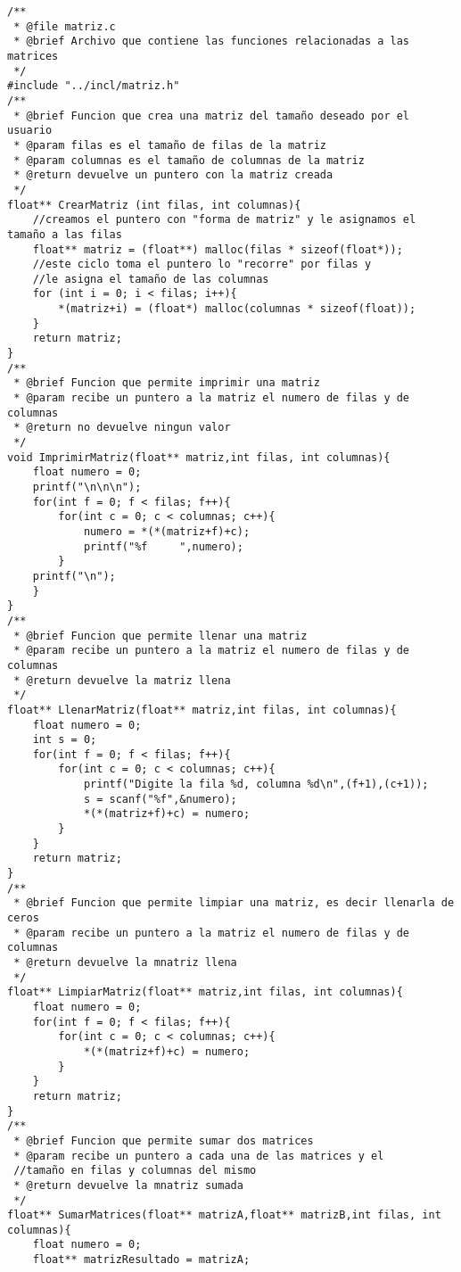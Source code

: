 \begin{verbatim} 
/**
 * @file matriz.c
 * @brief Archivo que contiene las funciones relacionadas a las matrices
 */
#include "../incl/matriz.h"
/**
 * @brief Funcion que crea una matriz del tamaño deseado por el usuario
 * @param filas es el tamaño de filas de la matriz
 * @param columnas es el tamaño de columnas de la matriz
 * @return devuelve un puntero con la matriz creada
 */
float** CrearMatriz (int filas, int columnas){
    //creamos el puntero con "forma de matriz" y le asignamos el tamaño a las filas
    float** matriz = (float**) malloc(filas * sizeof(float*));
    //este ciclo toma el puntero lo "recorre" por filas y 
    //le asigna el tamaño de las columnas 
    for (int i = 0; i < filas; i++){
        *(matriz+i) = (float*) malloc(columnas * sizeof(float));
    } 
    return matriz;
}
/**
 * @brief Funcion que permite imprimir una matriz
 * @param recibe un puntero a la matriz el numero de filas y de columnas
 * @return no devuelve ningun valor
 */
void ImprimirMatriz(float** matriz,int filas, int columnas){
    float numero = 0;
    printf("\n\n\n");
    for(int f = 0; f < filas; f++){
        for(int c = 0; c < columnas; c++){
            numero = *(*(matriz+f)+c);
            printf("%f     ",numero);
        }
    printf("\n"); 
    }   
}
/**
 * @brief Funcion que permite llenar una matriz
 * @param recibe un puntero a la matriz el numero de filas y de columnas
 * @return devuelve la matriz llena
 */
float** LlenarMatriz(float** matriz,int filas, int columnas){
    float numero = 0;
    int s = 0;
    for(int f = 0; f < filas; f++){
        for(int c = 0; c < columnas; c++){
            printf("Digite la fila %d, columna %d\n",(f+1),(c+1));
            s = scanf("%f",&numero);
            *(*(matriz+f)+c) = numero;
        }
    }
    return matriz;
}
/**
 * @brief Funcion que permite limpiar una matriz, es decir llenarla de ceros
 * @param recibe un puntero a la matriz el numero de filas y de columnas
 * @return devuelve la mnatriz llena
 */
float** LimpiarMatriz(float** matriz,int filas, int columnas){
    float numero = 0;
    for(int f = 0; f < filas; f++){
        for(int c = 0; c < columnas; c++){
            *(*(matriz+f)+c) = numero;
        }
    }
    return matriz;
}
/**
 * @brief Funcion que permite sumar dos matrices
 * @param recibe un puntero a cada una de las matrices y el 
 //tamaño en filas y columnas del mismo
 * @return devuelve la mnatriz sumada
 */
float** SumarMatrices(float** matrizA,float** matrizB,int filas, int columnas){
    float numero = 0;
    float** matrizResultado = matrizA;

\end{verbatim}
